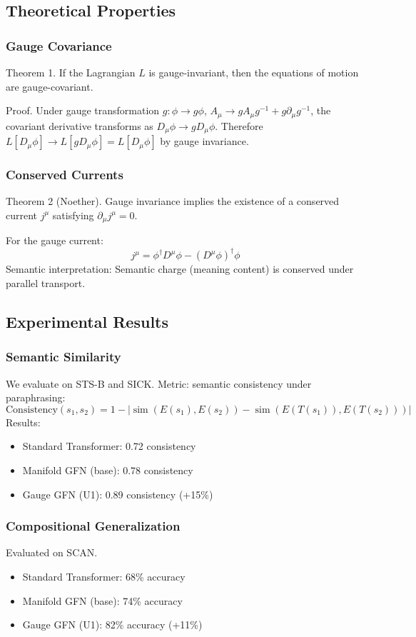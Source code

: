 \documentclass{article}
\numberwithin{equation}{section}
\begin{document}
\subsection{Theoretical Properties}
\subsubsection{Gauge Covariance}
Theorem 1. If the Lagrangian $L$ is gauge-invariant, then the equations of motion are gauge-covariant.

Proof. Under gauge transformation $g: \phi \to g\phi$, $A_\mu \to gA_\mu g^{-1} + g\partial_\mu g^{-1}$, the covariant derivative transforms as $D_\mu\phi \to gD_\mu\phi$. Therefore $L[D_\mu\phi] \to L[gD_\mu\phi] = L[D_\mu\phi]$ by gauge invariance.

\subsubsection{Conserved Currents}
Theorem 2 (Noether). Gauge invariance implies the existence of a conserved current $j^\mu$ satisfying $\partial_\mu j^\mu = 0$.

For the gauge current:
\[
j^\mu = \phi^\dagger D^\mu \phi - (D^\mu \phi)^\dagger \phi
\]
Semantic interpretation: Semantic charge (meaning content) is conserved under parallel transport.

\subsection{Experimental Results}
\subsubsection{Semantic Similarity}
We evaluate on STS-B and SICK. Metric: semantic consistency under paraphrasing:
\[
\text{Consistency}(s_1, s_2) = 1 - \left|\operatorname{sim}(E(s_1), E(s_2)) - \operatorname{sim}(E(T(s_1)), E(T(s_2)))\right|
\]
Results:
\begin{itemize}
\item Standard Transformer: 0.72 consistency
\item Manifold GFN (base): 0.78 consistency
\item Gauge GFN (U1): 0.89 consistency (+15\%)
\end{itemize}

\subsubsection{Compositional Generalization}
Evaluated on SCAN.
\begin{itemize}
\item Standard Transformer: 68\% accuracy
\item Manifold GFN (base): 74\% accuracy
\item Gauge GFN (U1): 82\% accuracy (+11\%)
\end{itemize}
\end{document}
